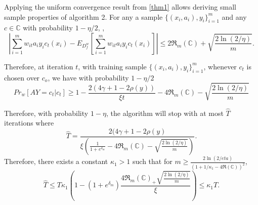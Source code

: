 \documentclass{article}
\begin{document}
Applying the uniform convergence result from \ref{thm1} allows deriving small sample properties of algorithm 2. For any a sample $\{(x_{i}, a_{i}), y_{i}\}_{i=1}^{m}$ and any $c\in \mathbb{C}$ with probability $1-\eta/2$, ,
\begin{equation}
\left|\displaystyle\sum_{i=1}^{m} w_{it}a_{i}y_{i}c_{t}(x_{i}) - E_{D_{f}^{w}}\left[\displaystyle\sum_{i=1}^{m} w_{it}a_{i}y_{i}c_{t}(x_{i})\right]\right| \leq 2\mathfrak{R}_{m}(\mathfrak{\mathbb{C}}) + \sqrt{\frac{2\ln(2/\eta)}{m}}.
\end{equation}

Therefore, at iteration $t$, with training sample $\{(x_{i}, a_{i}), y_{i}\}_{i=1}^{m}$,  whenever $c_{t}$ is chosen over $c_{o}$, we have with probability $1-\eta/2$
\begin{equation}
Pr_{w}[AY=c_{t}|c_{t}] \geq 1 - \frac{2(4\gamma + 1-2\rho(y))}{\xi t} - 4\mathfrak{R}_{m}(\mathfrak{\mathbb{C}}) - \sqrt{\frac{2\ln(2/\eta)}{m}}
\end{equation}

Therefore, with probability $1-\eta$, the algorithm will stop with at most $\widehat{T}$ iterations where
\begin{equation}
\widehat{T}= \frac{2(4\gamma + 1-2\rho(y)}{\xi\left(\frac{1}{1 + e^{\delta_{m}}} - 4\mathfrak{R}_{m}(\mathfrak{\mathbb{C}}) - \sqrt{\frac{2\ln(2/\eta)}{m}}\right)}.
\end{equation}
Therefore, there exists a constant $\kappa_{1} > 1$ such that for $m\geq \frac{2\ln(2/eta)}{\left(1 + 1/\kappa_{1} - 4\mathfrak{R}(\mathbb{C})\right)^2}$, 
\begin{equation}
\widehat{T} \leq T\kappa_{1}\left(1 - (1 + e^{\delta_{m}})\frac{4\mathfrak{R}_{m}(\mathfrak{\mathbb{C}}) _+ \sqrt{\frac{2\ln(2/\eta)}{m}}}{\xi}\right) \leq \kappa_{1}T.
\end{equation}






\end{document}

